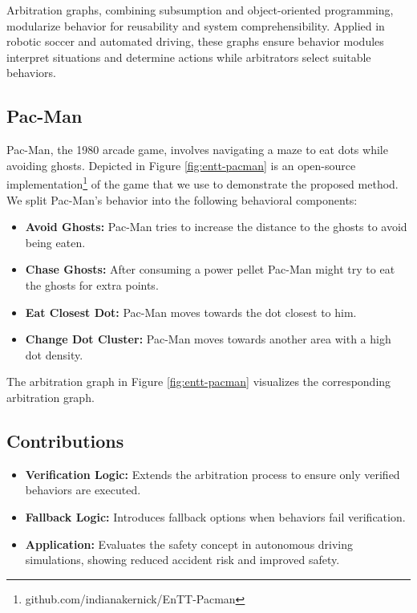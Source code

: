 Arbitration graphs, combining subsumption and object-oriented programming, modularize behavior for reusability and system comprehensibility. Applied in robotic soccer and automated driving, these graphs ensure behavior modules interpret situations and determine actions while arbitrators select suitable behaviors.

\subsection{Pac-Man}
Pac-Man, the 1980 arcade game, involves navigating a maze to eat dots while avoiding ghosts.
Depicted in Figure \ref{fig:entt-pacman} is an open-source implementation\footnote{github.com/indianakernick/EnTT-Pacman} of the game that we use to demonstrate the proposed method.
We split Pac-Man's behavior into the following behavioral components:

\begin{itemize}
    \item \textbf{Avoid Ghosts:} Pac-Man tries to increase the distance to the ghosts to avoid being eaten.
    \item \textbf{Chase Ghosts:} After consuming a power pellet Pac-Man might try to eat the ghosts for extra points.
    \item \textbf{Eat Closest Dot:} Pac-Man moves towards the dot closest to him.
    \item \textbf{Change Dot Cluster:} Pac-Man moves towards another area with a high dot density.
\end{itemize}

The arbitration graph in Figure \ref{fig:entt-pacman} visualizes the corresponding arbitration graph.

\subsection{Contributions}

\begin{itemize}
\item \textbf{Verification Logic:} Extends the arbitration process to ensure only verified behaviors are executed.
\item \textbf{Fallback Logic:} Introduces fallback options when behaviors fail verification.
\item \textbf{Application:} Evaluates the safety concept in autonomous driving simulations, showing reduced accident risk and improved safety.
\end{itemize}

